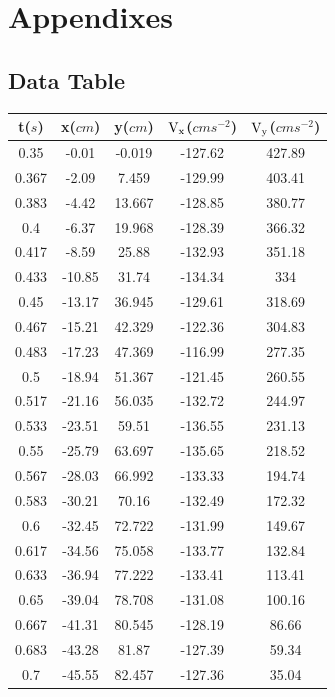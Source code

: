 \documentclass[12pt,a4paper]{article}
\begin{document}
\section{Appendixes}
\subsection{Data Table}


\begin{longtable}[h]{| c | c | c | c | c |}
    \hline
    t(\(s\))    & x(\(cm\)) & y(\(cm\))  & \(\rm{V}_{x}\)(\(cms^{-2}\)) &\(\rm{V}_{y}\)(\(cms^{-2}\))  \\
    \hline
    \endfirsthead
    \endhead
0.35  & -0.01   & -0.019  & -127.62 & 427.89  \\
0.367 & -2.09   & 7.459   & -129.99 & 403.41  \\
0.383 & -4.42   & 13.667  & -128.85 & 380.77  \\
0.4   & -6.37   & 19.968  & -128.39 & 366.32  \\
0.417 & -8.59   & 25.88   & -132.93 & 351.18  \\
0.433 & -10.85  & 31.74   & -134.34 & 334     \\
0.45  & -13.17  & 36.945  & -129.61 & 318.69  \\
0.467 & -15.21  & 42.329  & -122.36 & 304.83  \\
0.483 & -17.23  & 47.369  & -116.99 & 277.35  \\
0.5   & -18.94  & 51.367  & -121.45 & 260.55  \\
0.517 & -21.16  & 56.035  & -132.72 & 244.97  \\
0.533 & -23.51  & 59.51   & -136.55 & 231.13  \\
0.55  & -25.79  & 63.697  & -135.65 & 218.52  \\
0.567 & -28.03  & 66.992  & -133.33 & 194.74  \\
0.583 & -30.21  & 70.16   & -132.49 & 172.32  \\
0.6   & -32.45  & 72.722  & -131.99 & 149.67  \\
0.617 & -34.56  & 75.058  & -133.77 & 132.84  \\
0.633 & -36.94  & 77.222  & -133.41 & 113.41  \\
0.65  & -39.04  & 78.708  & -131.08 & 100.16  \\
0.667 & -41.31  & 80.545  & -128.19 & 86.66   \\
0.683 & -43.28  & 81.87   & -127.39 & 59.34   \\
0.7   & -45.55  & 82.457  & -127.36 & 35.04   \\

\end{longtable}
\end{document}
